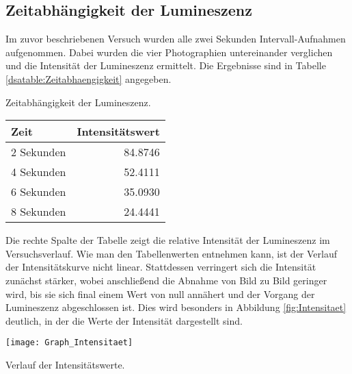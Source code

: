 \subsection{Zeitabhängigkeit der Lumineszenz} 

Im zuvor beschriebenen Versuch wurden alle zwei Sekunden Intervall-Aufnahmen aufgenommen. Dabei wurden die vier Photographien untereinander verglichen und die Intensität der Lumineszenz ermittelt. Die Ergebnisse sind in Tabelle \ref{dsatable:Zeitabhaengigkeit} angegeben.

\begin{dsatable}
 \caption{Zeitabhängigkeit der Lumineszenz.}
 \centering
 \begin{tabular}{lr} %
  \toprule
  Zeit &  Intensitätswert\\
  \midrule
  2 Sekunden      & 84.8746\\
  4 Sekunden      & 52.4111\\
  6 Sekunden      & 35.0930\\
  8 Sekunden      & 24.4441\\
  \bottomrule
 \end{tabular}
 \label{dsatable:Zeitabhaengigkeit}
\end{dsatable}


Die rechte Spalte der Tabelle zeigt die relative Intensität der Lumineszenz im Versuchsverlauf. Wie man den Tabellenwerten entnehmen kann, ist der Verlauf der Intensitätskurve nicht linear. Stattdessen verringert sich die Intensität zunächst stärker, wobei anschließend die Abnahme von Bild zu Bild geringer wird, bis sie sich final einem Wert von null annähert und der Vorgang der Lumineszenz abgeschlossen ist.
Dies wird besonders in Abbildung \ref{fig:Intensitaet} deutlich, in der die Werte der Intensität dargestellt sind.

\begin{dsafigure}
 \centering
 \texttt{[image: Graph\_Intensitaet]}
 \caption{Verlauf der Intensitätswerte.}
 \label{fig:Intensitaet}
\end{dsafigure}


